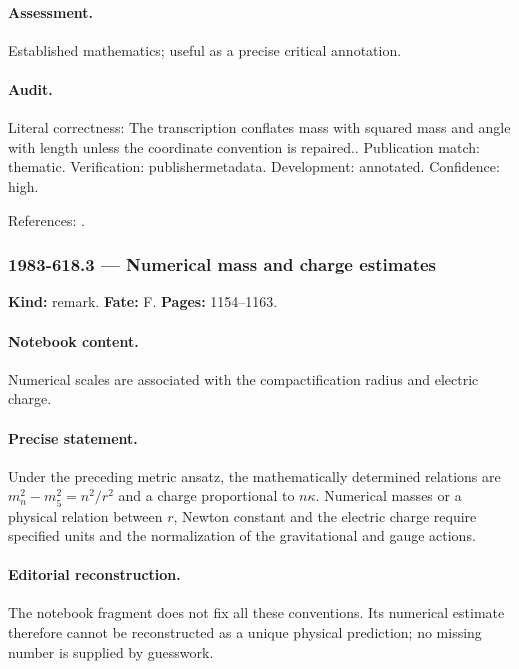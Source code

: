 \paragraph{Assessment.} Established mathematics; useful as a precise critical annotation.

\paragraph{Audit.} Literal correctness: The transcription conflates mass with squared mass and angle with length unless the coordinate convention is repaired.. Publication match: thematic. Verification: publishermetadata. Development: annotated. Confidence: high.

\noindent References: \citep{witten1981kaluza}.\par

\subsubsection{1983-618.3 --- Numerical mass and charge estimates}

\label{item:1983-618.3}

\noindent\textbf{Kind:} remark. \textbf{Fate:} F. \textbf{Pages:} 1154--1163.\par

\paragraph{Notebook content.} Numerical scales are associated with the compactification radius and electric charge.

\paragraph{Precise statement.} Under the preceding metric ansatz, the mathematically determined relations are $m_n^2-m_5^2=n^2/r^2$ and a charge proportional to $n\kappa$. Numerical masses or a physical relation between $r$, Newton constant and the electric charge require specified units and the normalization of the gravitational and gauge actions.

\paragraph{Editorial reconstruction.} The notebook fragment does not fix all these conventions. Its numerical estimate therefore cannot be reconstructed as a unique physical prediction; no missing number is supplied by guesswork.

